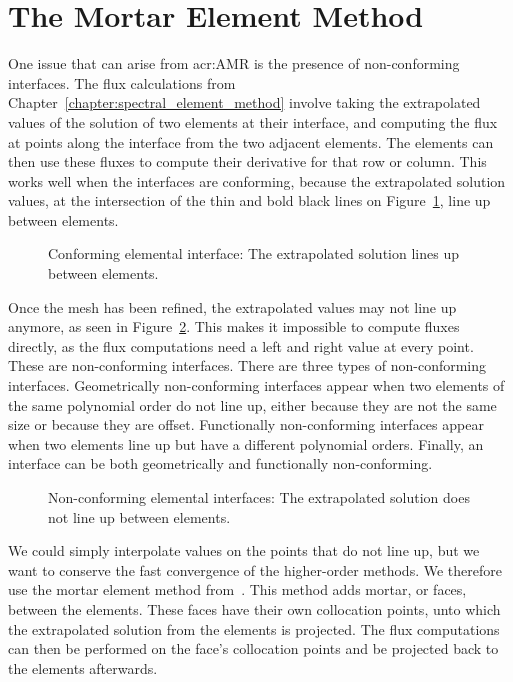\section{The Mortar Element Method}\label{section:adaptive_mesh_refinement:mortar_element_method}

One issue that can arise from \acrshort{acr:AMR} is the presence of non-conforming interfaces. The
flux calculations from Chapter~\ref{chapter:spectral_element_method} involve taking the extrapolated
values of the solution of two elements at their interface, and computing the flux at points along
the interface from the two adjacent elements. The elements can then use these fluxes to compute
their derivative for that row or column. This works well when the interfaces are conforming, because
the extrapolated solution values, at the intersection of the thin and bold black lines on
Figure~\ref{fig:conforming_interfaces}, line up between elements.

\begin{figure}[H]
	\centering
	
	\caption{Conforming elemental interface: The extrapolated solution lines up between elements.}\label{fig:conforming_interfaces}
\end{figure}

Once the mesh has been refined, the extrapolated values may not line up anymore, as seen in
Figure~\ref{fig:non_conforming_interfaces}. This makes it impossible to compute fluxes directly, as
the flux computations need a left and right value at every point. These are non-conforming
interfaces. There are three types of non-conforming interfaces. Geometrically non-conforming
interfaces appear when two elements of the same polynomial order do not line up, either because they
are not the same size or because they are offset. Functionally non-conforming interfaces appear when
two elements line up but have a different polynomial orders. Finally, an interface can be both
geometrically and functionally non-conforming.

\begin{figure}[H]
	\centering
	
	\caption{Non-conforming elemental interfaces: The extrapolated solution does not line up between elements.}\label{fig:non_conforming_interfaces}
\end{figure}

We could simply interpolate values on the points that do not line up, but we want to conserve the
fast convergence of the higher-order methods. We therefore use the mortar element method
from~\cite{Maday1989}. This method adds mortar, or faces, between the elements. These faces have
their own collocation points, unto which the extrapolated solution from the elements is projected.
The flux computations can then be performed on the face's collocation points and be projected back
to the elements afterwards.


